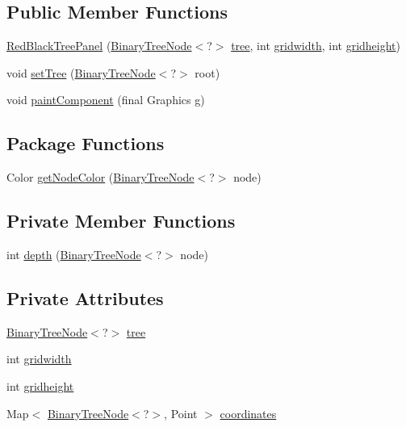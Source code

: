 \subsection*{Public Member Functions}
\begin{DoxyCompactItemize}
\item 
\hyperlink{class_red_black_tree_panel_ae5cc584d5b2b9b18f8de188d8c2d136b}{Red\+Black\+Tree\+Panel} (\hyperlink{interface_binary_tree_node}{Binary\+Tree\+Node}$<$?$>$ \hyperlink{class_red_black_tree_panel_a30733682714e973c0702890d2e43c357}{tree}, int \hyperlink{class_red_black_tree_panel_abfb80e580d5940d6f3c56032cca0a16d}{gridwidth}, int \hyperlink{class_red_black_tree_panel_a3b5cac95680f28f3248d30987b6b682c}{gridheight})
\item 
void \hyperlink{class_red_black_tree_panel_a0d81979df97b03d2458063f5c212e4da}{set\+Tree} (\hyperlink{interface_binary_tree_node}{Binary\+Tree\+Node}$<$?$>$ root)
\item 
void \hyperlink{class_red_black_tree_panel_a8a909ac81b24b11deb7ab29751249217}{paint\+Component} (final Graphics g)
\end{DoxyCompactItemize}
\subsection*{Package Functions}
\begin{DoxyCompactItemize}
\item 
Color \hyperlink{class_red_black_tree_panel_abf4a688b12b190a67711ea683dc7a7a2}{get\+Node\+Color} (\hyperlink{interface_binary_tree_node}{Binary\+Tree\+Node}$<$?$>$ node)
\end{DoxyCompactItemize}
\subsection*{Private Member Functions}
\begin{DoxyCompactItemize}
\item 
int \hyperlink{class_red_black_tree_panel_a1fb487a5605fcada57c47c18ae3988f6}{depth} (\hyperlink{interface_binary_tree_node}{Binary\+Tree\+Node}$<$?$>$ node)
\end{DoxyCompactItemize}
\subsection*{Private Attributes}
\begin{DoxyCompactItemize}
\item 
\hyperlink{interface_binary_tree_node}{Binary\+Tree\+Node}$<$?$>$ \hyperlink{class_red_black_tree_panel_a30733682714e973c0702890d2e43c357}{tree}
\item 
int \hyperlink{class_red_black_tree_panel_abfb80e580d5940d6f3c56032cca0a16d}{gridwidth}
\item 
int \hyperlink{class_red_black_tree_panel_a3b5cac95680f28f3248d30987b6b682c}{gridheight}
\item 
Map$<$ \hyperlink{interface_binary_tree_node}{Binary\+Tree\+Node}$<$?$>$, Point $>$ \hyperlink{class_red_black_tree_panel_a195d2ca0e54a0e3ef7a4c8b92ad131c4}{coordinates}
\end{DoxyCompactItemize}


